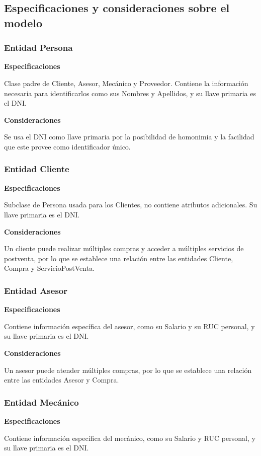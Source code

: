 \documentclass[12pt]{article}
\begin{document}
\subsection{Especificaciones y consideraciones sobre el modelo}

\subsubsection{Entidad Persona}
\textbf{Especificaciones}

Clase padre de Cliente, Asesor, Mecánico y Proveedor. Contiene la información necesaria para identificarlos como sus Nombres y Apellidos, y su llave primaria es el DNI.

\textbf{Consideraciones}

Se usa el DNI como llave primaria por la posibilidad de homonimia y la facilidad que este provee como identificador único.

\subsubsection{Entidad Cliente}
\textbf{Especificaciones}

Subclase de Persona usada para los Clientes, no contiene atributos adicionales. Su llave primaria es el DNI.

\textbf{Consideraciones}

Un cliente puede realizar múltiples compras y acceder a múltiples servicios de postventa, por lo que se establece una relación entre las entidades Cliente, Compra y ServicioPostVenta.

\subsubsection{Entidad Asesor}
\textbf{Especificaciones}

Contiene información específica del asesor, como su Salario y su RUC personal, y su llave primaria es el DNI.

\textbf{Consideraciones}

Un asesor puede atender múltiples compras, por lo que se establece una relación entre las entidades Asesor y Compra. 

\subsubsection{Entidad Mecánico}
\textbf{Especificaciones}

Contiene información específica del mecánico, como su Salario y RUC personal, y su llave primaria es el DNI.
\end{document}
